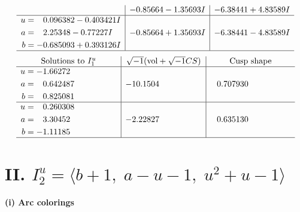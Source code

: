 \documentclass[1p]{elsarticle_modified}
\theoremstyle{definition}
\newcommand{\I}{\sqrt{-1}}
\begin{document}
$$\begin{array}{c|c|c}
 & -0.85664 - 1.35693 I & -6.38441 + 4.83589 I \\ \hline\begin{aligned}
u &= \phantom{-}0.096382 - 0.403421 I \\
a &= \phantom{-}2.25348 - 0.77227 I \\
b &= -0.685093 + 0.393126 I\end{aligned}
 & -0.85664 + 1.35693 I & -6.38441 - 4.83589 I\\
 \hline 
 \end{array}$$\newpage$$\begin{array}{c|c|c}  
\text{Solutions to }I^u_{1}& \I (\text{vol} + \sqrt{-1}CS) & \text{Cusp shape}\\
 \hline 
\begin{aligned}
u &= -1.66272\phantom{ +0.000000I} \\
a &= \phantom{-}0.642487\phantom{ +0.000000I} \\
b &= \phantom{-}0.825081\phantom{ +0.000000I}\end{aligned}
 & -10.1504\phantom{ +0.000000I} & \phantom{-}0.707930\phantom{ +0.000000I} \\ \hline\begin{aligned}
u &= \phantom{-}0.260308\phantom{ +0.000000I} \\
a &= \phantom{-}3.30452\phantom{ +0.000000I} \\
b &= -1.11185\phantom{ +0.000000I}\end{aligned}
 & -2.22827\phantom{ +0.000000I} & \phantom{-}0.635130\phantom{ +0.000000I}\\
 \hline 
 \end{array}$$\newpage\newpage\renewcommand{\arraystretch}{1}
\centering \section*{II. $I^u_{2}= \langle b+1,\;a- u-1,\;u^2+u-1 \rangle$}
\flushleft \textbf{(i) Arc colorings}\\
\end{document}
